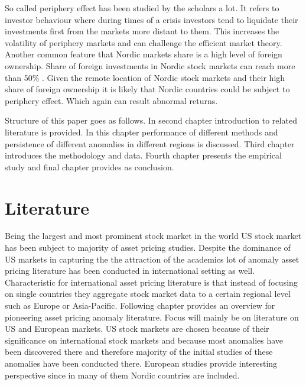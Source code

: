 \documentclass{article}
\begin{document}
So called periphery effect has been studied by the scholars a lot. %
It refers to investor behaviour where during times of a crisis investors tend to liquidate their investments first from the markets more distant to them. This increases the volatility of periphery markets and can challenge the efficient market theory. Another common feature that Nordic markets share is a high level of foreign ownership. Share of foreign investments in Nordic stock markets can reach more than 50\% \footnotemark. Given the remote location of Nordic stock markets and their high share of foreign ownership it is likely that Nordic countries could be subject to periphery effect. Which again can result abnormal returns.


Structure of this paper goes as follows. In second chapter introduction to related literature is provided. In this chapter performance of different methods and persistence of different anomalies in different regions is discussed. Third chapter introduces the methodology and data. Fourth chapter presents the empirical study and final chapter provides as conclusion.


\section{Literature}
Being the largest and most prominent stock market in the world US stock market has been subject to majority of asset pricing studies. Despite the dominance of US markets in capturing the the attraction of the academics lot of anomaly asset pricing literature has been conducted in international setting as well. Characteristic for international asset pricing literature is that instead of focusing on single countries they aggregate stock market data to a certain regional level such as Europe or Asia-Pacific. Following chapter provides an overview for pioneering asset pricing anomaly literature. Focus will mainly be on literature on US and European markets. US stock markets are chosen because of their significance on international stock markets and because most anomalies have been discovered there and therefore majority of the initial studies of these anomalies have been conducted there. European studies provide interesting perspective since in many of them Nordic countries are included. 
\end{document}

